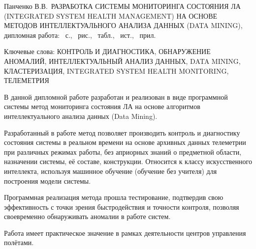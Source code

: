 \newcommand{\thesistitle}{Разработка системы мониторинга состояния ЛА (Integrated System Health Management) на основе методов интеллектуального анализа данных (Data Mining)}
\newcommand{\thesisauthor}{Панченко В.В.}
\newcommand{\thesiskeywords}{контроль и диагностика, обнаружение аномалий, интеллектуальный анализ данных, Data Mining, кластеризация, Integrated System Health Monitoring, телеметрия}

\protect{}
\sloppy
{
\thesisauthor\ \MakeUppercase{\thesistitle}, дипломная работа: \pagecount~с., ~рис., ~табл., ~ист., ~прил.

Ключевые слова: \MakeUppercase{\thesiskeywords}
}
\medskip

В данной дипломной работе разработан и реализован в виде программной системы метод мониторинга состояния ЛА на основе алгоритмов интеллектуального анализа данных (Data Mining).

Разработанный в работе метод позволяет производить контроль и диагностику состояния системы в реальном времени на основе архивных данных телеметрии при различных режимах работы, без априорных знаний о предметной области, назначении системы, её составе, конструкции. Относится к классу искусственного интеллекта, используя машинное обучение (обучение без учителя) для построения модели системы.

Программная реализация метода прошла тестирование, подтвердив свою эффективность с точки зрения быстродействия и точности контроля, позволяя своевременно обнаруживать аномалии в работе систем.

Работа имеет практическое значение в рамках деятельности центров управления полётами.
